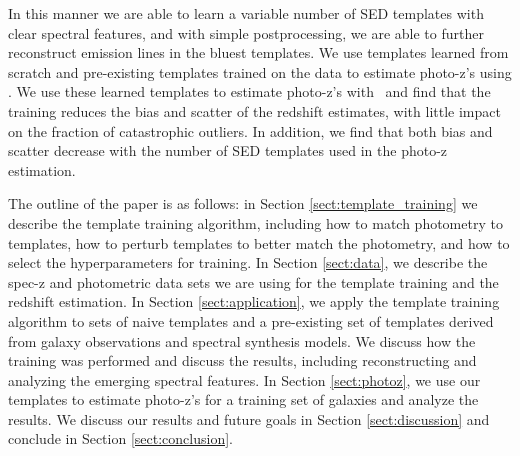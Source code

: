In this manner we are able to learn a variable number of SED templates with clear spectral features, and with simple postprocessing, we are able to further reconstruct emission lines in the bluest templates.
We use templates learned from scratch and pre-existing templates trained on the data to estimate photo-z's using \bpz \citep{Benitez2000a}.
We use these learned templates to estimate photo-z's with \bpz\ and find that the training reduces the bias and scatter of the redshift estimates, with little impact on the fraction of catastrophic outliers.
In addition, we find that both bias and scatter decrease with the number of SED templates used in the photo-z estimation.

The outline of the paper is as follows:
in Section \ref{sect:template_training} we describe the template training algorithm, including how to match photometry to templates, how to perturb templates to better match the photometry, and how to select the hyperparameters for training.
In Section \ref{sect:data}, we describe the spec-z and photometric data sets we are using for the template training and the redshift estimation.
In Section \ref{sect:application}, we apply the template training algorithm to sets of naive templates and a pre-existing set of templates derived from galaxy observations and spectral synthesis models.
We discuss how the training was performed and discuss the results, including reconstructing and analyzing the emerging spectral features.
In Section \ref{sect:photoz}, we use our templates to estimate photo-z's for a training set of galaxies and analyze the results.
We discuss our results and future goals in Section \ref{sect:discussion} and conclude in Section \ref{sect:conclusion}.


